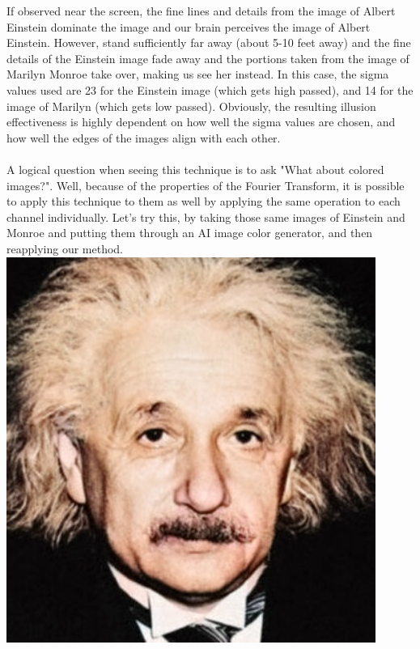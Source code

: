 \documentclass[notitlepage]{article}
\begin{document}
If observed near the screen, the fine lines and details from the image of Albert Einstein dominate
the image and our brain perceives the image of Albert Einstein. However, stand sufficiently far away
(about 5-10 feet away) and the fine details of the Einstein image fade away and the portions taken from
the image of Marilyn Monroe take over, making us see her instead.
In this case, the sigma values used are 23 for the Einstein image (which gets high passed), and 14 for the image
of Marilyn (which gets low passed). Obviously, the resulting illusion effectiveness is highly dependent on how well
the sigma values are chosen, and how well the edges of the images align with each other.
\\\\
A logical question when seeing this technique is to ask "What about colored images?". Well, because of the properties of the
Fourier Transform, it is possible to apply this technique to them as well by applying the same operation to each channel individually.
Let's try this, by taking those same images of Einstein and Monroe and putting them through an AI image color generator, and then reapplying
our method.
\\
\includegraphics[width=4.75in]{../assets/images/rgb_einstein.png}
\\
\end{document}
